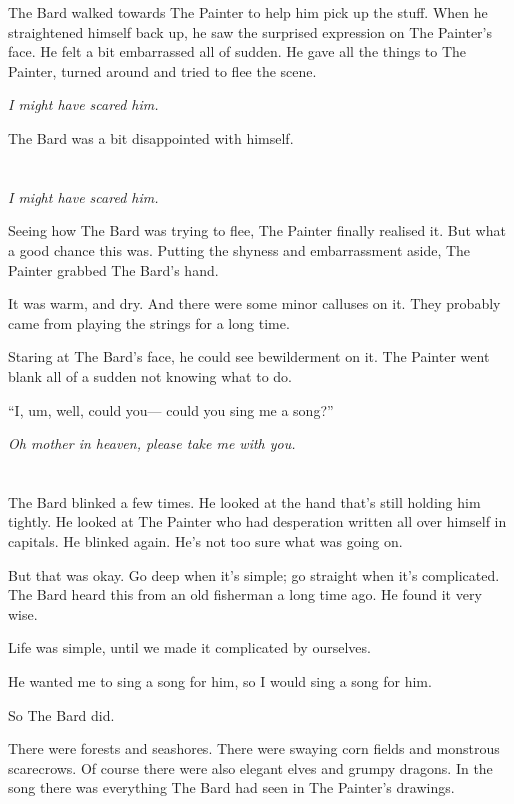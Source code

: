 \documentclass{article}
\begin{document}
The Bard walked towards The Painter to help him pick up the stuff. When he straightened himself back up, he saw the surprised expression on The Painter's face. He felt a bit embarrassed all of sudden. He gave all the things to The Painter, turned around and tried to flee the scene.

\textit{I might have scared him.}

The Bard was a bit disappointed with himself.

\section{} %
\textit{I might have scared him.}

Seeing how The Bard was trying to flee, The Painter finally realised it.
But what a good chance this was. Putting the shyness and embarrassment aside, The Painter grabbed The Bard's hand.

It was warm, and dry. And there were some minor calluses on it. They probably came from playing the strings for a long time.

Staring at The Bard's face, he could see bewilderment on it.  The Painter went blank all of a sudden not knowing what to do.

“I, um, well, could you— could you sing me a song?”

\textit{Oh mother in heaven, please take me with you.}

\section{} %
The Bard blinked a few times. He looked at the hand that's still holding him tightly. He looked at The Painter who had desperation written all over himself in capitals. He blinked again. He's not too sure what was going on.

But that was okay. Go deep when it's simple; go straight when it's complicated. The Bard heard this from an old fisherman a long time ago. He found it very wise.

Life was simple, until we made it complicated by ourselves.

He wanted me to sing a song for him, so I would sing a song for him.

So The Bard did.

There were forests and seashores. There were swaying corn fields and monstrous scarecrows. Of course there were also elegant elves and grumpy dragons. In the song there was everything The Bard had seen in The Painter's drawings.
\end{document}
